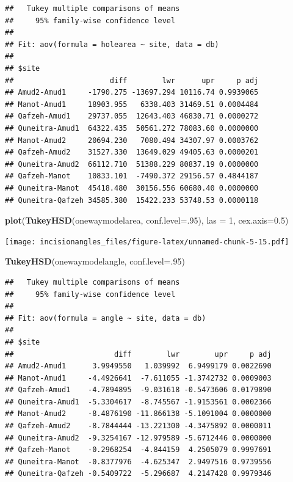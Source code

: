 \documentclass[
]{article}
\newenvironment{Shaded}{\begin{snugshade}}{\end{snugshade}}
\newcommand{\AttributeTok}[1]{\textcolor[rgb]{0.13,0.29,0.53}{#1}}
\newcommand{\DecValTok}[1]{\textcolor[rgb]{0.00,0.00,0.81}{#1}}
\newcommand{\FloatTok}[1]{\textcolor[rgb]{0.00,0.00,0.81}{#1}}
\newcommand{\FunctionTok}[1]{\textcolor[rgb]{0.13,0.29,0.53}{\textbf{#1}}}
\newcommand{\NormalTok}[1]{#1}
\begin{document}
\begin{verbatim}
##   Tukey multiple comparisons of means
##     95% family-wise confidence level
## 
## Fit: aov(formula = holearea ~ site, data = db)
## 
## $site
##                      diff        lwr      upr     p adj
## Amud2-Amud1     -1790.275 -13697.294 10116.74 0.9939065
## Manot-Amud1     18903.955   6338.403 31469.51 0.0004484
## Qafzeh-Amud1    29737.055  12643.403 46830.71 0.0000272
## Quneitra-Amud1  64322.435  50561.272 78083.60 0.0000000
## Manot-Amud2     20694.230   7080.494 34307.97 0.0003762
## Qafzeh-Amud2    31527.330  13649.029 49405.63 0.0000201
## Quneitra-Amud2  66112.710  51388.229 80837.19 0.0000000
## Qafzeh-Manot    10833.101  -7490.372 29156.57 0.4844187
## Quneitra-Manot  45418.480  30156.556 60680.40 0.0000000
## Quneitra-Qafzeh 34585.380  15422.233 53748.53 0.0000118
\end{verbatim}

\begin{Shaded}
\begin{Highlighting}[]
\FunctionTok{plot}\NormalTok{(}\FunctionTok{TukeyHSD}\NormalTok{(onewaymodelarea, }\AttributeTok{conf.level=}\NormalTok{.}\DecValTok{95}\NormalTok{), }\AttributeTok{las =} \DecValTok{1}\NormalTok{, }\AttributeTok{cex.axis=}\FloatTok{0.5}\NormalTok{)}
\end{Highlighting}
\end{Shaded}

\texttt{[image: incisionangles\_files/figure-latex/unnamed-chunk-5-15.pdf]}

\begin{Shaded}
\begin{Highlighting}[]
\FunctionTok{TukeyHSD}\NormalTok{(onewaymodelangle, }\AttributeTok{conf.level=}\NormalTok{.}\DecValTok{95}\NormalTok{) }
\end{Highlighting}
\end{Shaded}

\begin{verbatim}
##   Tukey multiple comparisons of means
##     95% family-wise confidence level
## 
## Fit: aov(formula = angle ~ site, data = db)
## 
## $site
##                       diff        lwr        upr     p adj
## Amud2-Amud1      3.9949550   1.039992  6.9499179 0.0022690
## Manot-Amud1     -4.4926641  -7.611055 -1.3742732 0.0009003
## Qafzeh-Amud1    -4.7894895  -9.031618 -0.5473606 0.0179890
## Quneitra-Amud1  -5.3304617  -8.745567 -1.9153561 0.0002366
## Manot-Amud2     -8.4876190 -11.866138 -5.1091004 0.0000000
## Qafzeh-Amud2    -8.7844444 -13.221300 -4.3475892 0.0000011
## Quneitra-Amud2  -9.3254167 -12.979589 -5.6712446 0.0000000
## Qafzeh-Manot    -0.2968254  -4.844159  4.2505079 0.9997691
## Quneitra-Manot  -0.8377976  -4.625347  2.9497516 0.9739556
## Quneitra-Qafzeh -0.5409722  -5.296687  4.2147428 0.9979346
\end{verbatim}
\end{document}

